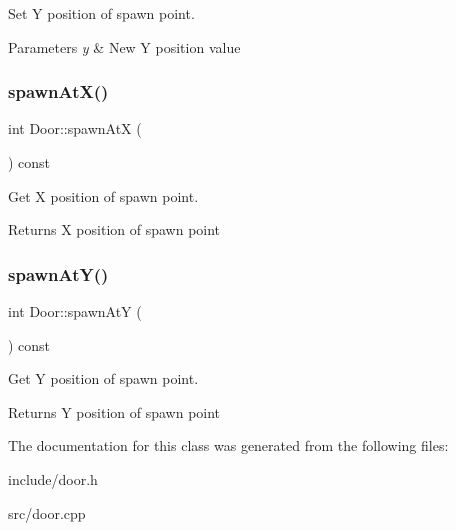 Set Y position of spawn point. 


\begin{DoxyParams}{Parameters}
{\em y} & New Y position value \\
\hline
\end{DoxyParams}
\mbox{\label{class_door_af36a171c2f6e3fe7b21d2027ada4199f}} 
\subsubsection{\texorpdfstring{spawn\+At\+X()}{spawnAtX()}}
{\footnotesize\ttfamily int Door\+::spawn\+AtX (\begin{DoxyParamCaption}{ }\end{DoxyParamCaption}) const}



Get X position of spawn point. 

\begin{DoxyReturn}{Returns}
X position of spawn point 
\end{DoxyReturn}
\mbox{\label{class_door_a35f7940f9b52caad0bbf39d2054fd0a4}} 
\subsubsection{\texorpdfstring{spawn\+At\+Y()}{spawnAtY()}}
{\footnotesize\ttfamily int Door\+::spawn\+AtY (\begin{DoxyParamCaption}{ }\end{DoxyParamCaption}) const}



Get Y position of spawn point. 

\begin{DoxyReturn}{Returns}
Y position of spawn point 
\end{DoxyReturn}


The documentation for this class was generated from the following files\+:\begin{DoxyCompactItemize}
\item 
include/door.\+h\item 
src/door.\+cpp\end{DoxyCompactItemize}
